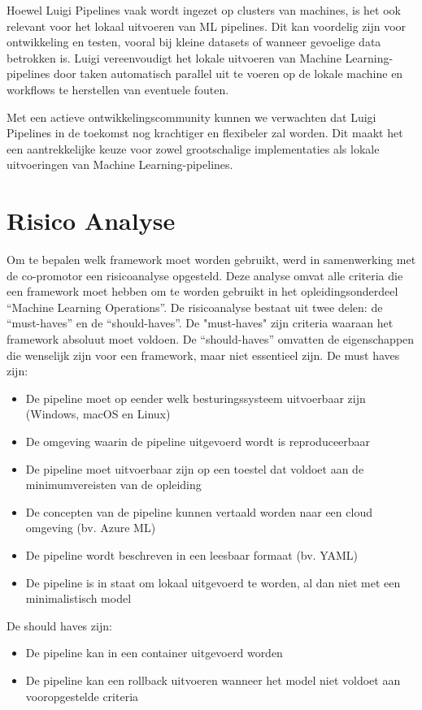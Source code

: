 Hoewel Luigi Pipelines vaak wordt ingezet op clusters van machines, is het ook relevant voor het lokaal uitvoeren van ML pipelines. Dit kan voordelig zijn voor ontwikkeling en testen, vooral bij kleine datasets of wanneer gevoelige data betrokken is. Luigi vereenvoudigt het lokale uitvoeren van Machine Learning-pipelines door taken automatisch parallel uit te voeren op de lokale machine en workflows te herstellen van eventuele fouten.

Met een actieve ontwikkelingscommunity kunnen we verwachten dat Luigi Pipelines in de toekomst nog krachtiger en flexibeler zal worden. Dit maakt het een aantrekkelijke keuze voor zowel grootschalige implementaties als lokale uitvoeringen van Machine Learning-pipelines.
\section{Risico Analyse}
Om te bepalen welk framework moet worden gebruikt, werd in samenwerking met de co-promotor een risicoanalyse opgesteld. Deze analyse omvat alle criteria die een framework moet hebben om te worden gebruikt in het opleidingsonderdeel ``Machine Learning Operations''.
De risicoanalyse bestaat uit twee delen: de ``must-haves'' en de ``should-haves''. De "must-haves" zijn criteria waaraan het framework absoluut moet voldoen. De ``should-haves'' omvatten de eigenschappen die wenselijk zijn voor een framework, maar niet essentieel zijn.
De must haves zijn:
\begin{itemize}
    \item De pipeline moet op eender welk besturingssysteem uitvoerbaar zijn (Windows, macOS en Linux)
    \item De omgeving waarin de pipeline uitgevoerd wordt is reproduceerbaar
    \item De pipeline moet uitvoerbaar zijn op een toestel dat voldoet aan de minimumvereisten van de opleiding
    \item De concepten van de pipeline kunnen vertaald worden naar een cloud omgeving (bv. Azure ML)
    \item De pipeline wordt beschreven in een leesbaar formaat (bv. YAML)
    \item De pipeline is in staat om lokaal uitgevoerd te worden, al dan niet met een minimalistisch model
\end{itemize}
De should haves zijn:
\begin{itemize}
    \item De pipeline kan in een container uitgevoerd worden
    \item De pipeline kan een rollback uitvoeren wanneer het model niet voldoet aan vooropgestelde criteria
\end{itemize}

